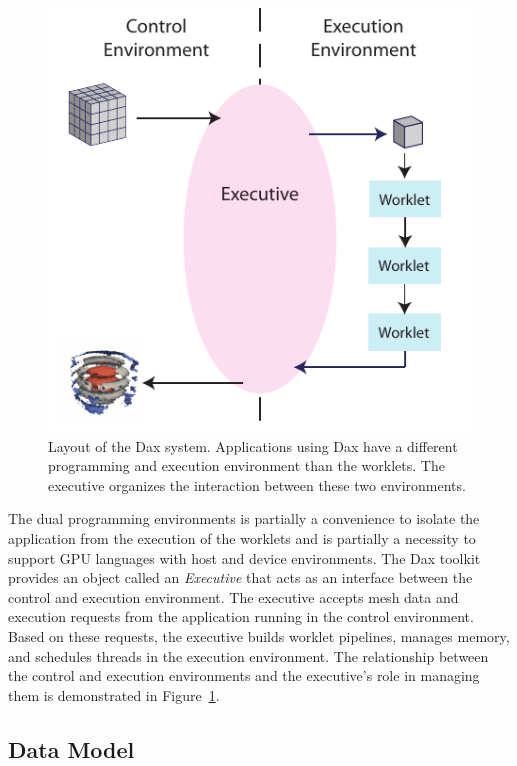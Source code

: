 \documentclass{vgtc}                          %
\newcommand*{\keyterm}[1]{\emph{#1}}
\begin{document}
\begin{figure}
  \centering
  \includegraphics{images/DaxDiagram}
  \caption{Layout of the Dax system.
    Applications using Dax have a different programming and execution environment than the worklets.
    The executive organizes the interaction between these two environments.}
  \label{fig:DaxDiagram}
\end{figure}

The dual programming environments is partially a convenience to isolate the
application from the execution of the worklets and is partially a necessity to
support GPU languages with host and device environments.  The Dax toolkit
provides an object called an \keyterm{Executive} that acts as an interface
between the control and execution environment.  The executive accepts mesh data
and execution requests from the application running in the control environment.
Based on these requests, the executive builds worklet pipelines, manages memory,
and schedules threads in the execution environment.  The relationship between
the control and execution environments and the executive's role in managing them
is demonstrated in Figure~\ref{fig:DaxDiagram}.

\subsection{Data Model}
\label{sec:DataModel}
\end{document}
